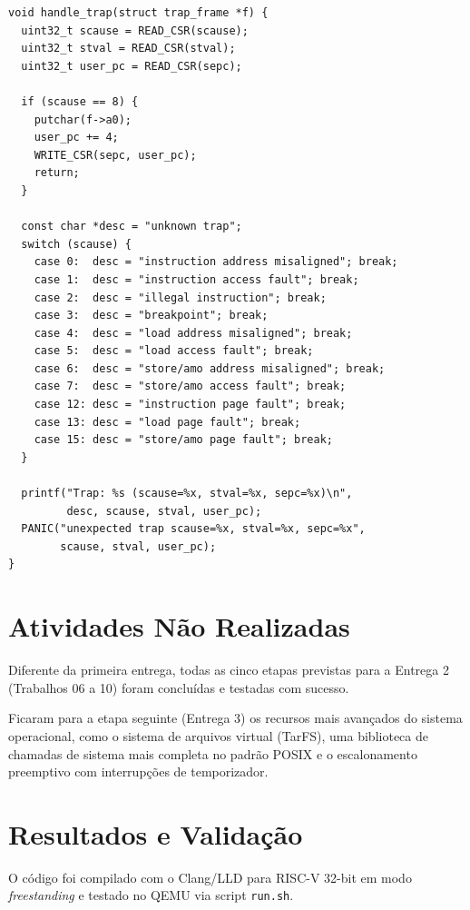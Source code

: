 \documentclass[12pt]{article}
\begin{document}
\begin{verbatim}
void handle_trap(struct trap_frame *f) {
  uint32_t scause = READ_CSR(scause);
  uint32_t stval = READ_CSR(stval);
  uint32_t user_pc = READ_CSR(sepc);

  if (scause == 8) {
    putchar(f->a0);
    user_pc += 4;
    WRITE_CSR(sepc, user_pc);
    return;
  }

  const char *desc = "unknown trap";
  switch (scause) {
    case 0:  desc = "instruction address misaligned"; break;
    case 1:  desc = "instruction access fault"; break;
    case 2:  desc = "illegal instruction"; break;
    case 3:  desc = "breakpoint"; break;
    case 4:  desc = "load address misaligned"; break;
    case 5:  desc = "load access fault"; break;
    case 6:  desc = "store/amo address misaligned"; break;
    case 7:  desc = "store/amo access fault"; break;
    case 12: desc = "instruction page fault"; break;
    case 13: desc = "load page fault"; break;
    case 15: desc = "store/amo page fault"; break;
  }

  printf("Trap: %s (scause=%x, stval=%x, sepc=%x)\n",
         desc, scause, stval, user_pc);
  PANIC("unexpected trap scause=%x, stval=%x, sepc=%x",
        scause, stval, user_pc);
}
\end{verbatim}

\section{Atividades Não Realizadas}

Diferente da primeira entrega, todas as cinco etapas previstas para a Entrega 2 (Trabalhos 06 a 10) foram concluídas e testadas com sucesso.

Ficaram para a etapa seguinte (Entrega 3) os recursos mais avançados do sistema operacional, como o sistema de arquivos virtual (TarFS), uma biblioteca de chamadas de sistema mais completa no padrão POSIX e o escalonamento preemptivo com interrupções de temporizador.

\section{Resultados e Validação}

O código foi compilado com o Clang/LLD para RISC-V 32-bit em modo \textit{freestanding} e testado no QEMU via script \texttt{run.sh}.
\end{document}
